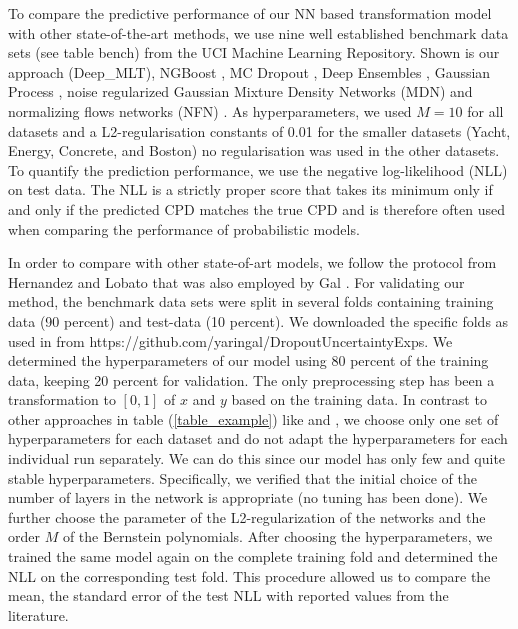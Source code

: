 \documentclass[a4paper,conference]{IEEEtran}
\begin{document}
To compare the predictive performance of our NN based transformation model with other state-of-the-art methods, we use nine well established benchmark data sets (see table bench) from the UCI Machine Learning Repository. Shown is our approach (Deep\_MLT), NGBoost \cite{Duan2020}, MC Dropout \cite{Gal2015}, Deep Ensembles \cite{NIPS2017_7219}, Gaussian Process \cite{Duan}, noise regularized Gaussian Mixture Density Networks (MDN) and normalizing flows networks (NFN) \cite{Rothfuss}. As hyperparameters, we used $M=10$ for all datasets and a L2-regularisation constants of 0.01 for the smaller datasets  (Yacht, Energy, Concrete, and Boston) no regularisation was used in the other datasets.
To quantify the prediction performance, we use the negative log-likelihood (NLL) on test data. The NLL is a strictly proper score that takes its minimum only if and only if the predicted CPD matches the true CPD \cite{TODO} and is therefore often used when comparing the performance of probabilistic models.


In order to compare with other state-of-art models, we follow the protocol from Hernandez and Lobato \cite{Hernandez-Lobato2015} that was also employed by Gal \cite{Gal2015}. For validating our method, the benchmark data sets were split in several folds containing training data (90 percent) and test-data (10 percent).  We downloaded the specific folds as used in  \cite{Gal2015} from https://github.com/yaringal/DropoutUncertaintyExps. We determined the hyperparameters of our model using 80 percent of the training data, keeping 20 percent for validation. The only preprocessing step has been a transformation to $[0,1]$  of $x$ and $y$ based on the training data. In contrast to other approaches in table (\ref{table_example}) like \cite{Gal2015} and \cite{Duan2020}, we choose only one set of hyperparameters for each dataset and do not adapt the hyperparameters for each individual run separately. We can do this since our model has only few and quite stable hyperparameters. Specifically, we verified that the initial choice of the number of layers in the network is appropriate (no tuning has been done). We further choose the parameter of the L2-regularization of the networks and the order $M$ of the Bernstein polynomials. After choosing the hyperparameters, we trained the same model again on the complete training fold and determined the NLL on the corresponding test fold. This procedure allowed us to compare the mean, the standard error of the test NLL with reported values from the literature.
\end{document}
